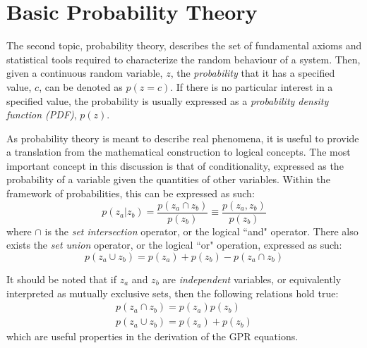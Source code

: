 \documentclass{article}
\begin{document}
\section{Basic Probability Theory}
\label{sec:ProbabilityTheory}

The second topic, probability theory, describes the set of fundamental axioms and statistical tools required to characterize the random behaviour of a system. Then, given a continuous random variable, $z$, the \emph{probability} that it has a specified value, $c$, can be denoted as $p\!\left(z=c\right)$. If there is no particular interest in a specified value, the probability is usually expressed as a \emph{probability density function (PDF)}, $p\!\left(z\right)$.

As probability theory is meant to describe real phenomena, it is useful to provide a translation from the mathematical construction to logical concepts. The most important concept in this discussion is that of conditionality, expressed as the probability of a variable given the quantities of other variables. Within the framework of probabilities, this can be expressed as such:
\begin{equation}
\label{eq:ProbabilityConditional}
	p\!\left(z_a|z_b\right) = \frac{p\!\left(z_a \cap z_b\right)}{p\!\left(z_b\right)} \equiv \frac{p\!\left(z_a,z_b\right)}{p\!\left(z_b\right)}
\end{equation}
where $\cap$ is the \emph{set intersection} operator, or the logical ``and" operator. There also exists the \emph{set union} operator, or the logical ``or" operation, expressed as such:
\begin{equation}
\label{eq:ProbabilityUnion}
	p\!\left(z_a \cup z_b\right) = p\!\left(z_a\right) + p\!\left(z_b\right) - p\!\left(z_a \cap z_b\right)
\end{equation}

It should be noted that if $z_a$ and $z_b$ are \emph{independent} variables, or equivalently interpreted as mutually exclusive sets, then the following relations hold true:
\begin{equation}
\label{eq:IndependentProbabilities}
	\begin{gathered}
	p\!\left(z_a \cap z_b\right) = p\!\left(z_a\right) p\!\left(z_b\right) \\
	p\!\left(z_a \cup z_b\right) = p\!\left(z_a\right) + p\!\left(z_b\right)
	\end{gathered}
\end{equation}
which are useful properties in the derivation of the GPR equations.
\end{document}
